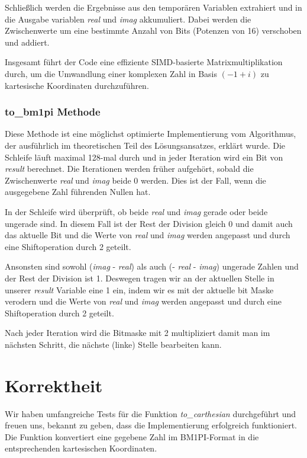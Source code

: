 \documentclass[course=erap]{aspdoc}
\begin{document}
    Schließlich werden die Ergebnisse aus den temporären Variablen extrahiert und in die Ausgabe variablen \textit{real} und \textit{imag} akkumuliert.
    Dabei werden die Zwischenwerte um eine bestimmte Anzahl von Bits (Potenzen von 16) verschoben und addiert.

    Insgesamt führt der Code eine effiziente SIMD-basierte Matrixmultiplikation durch, um die Umwandlung einer komplexen Zahl in Basis $(-1+i)$ zu kartesische Koordinaten durchzuführen.

    \subsubsection{to\_bm1pi Methode}
    Diese Methode ist eine möglichst optimierte Implementierung vom Algorithmus, der ausführlich im theoretischen Teil des Lösungsansatzes, erklärt wurde.
    Die Schleife läuft maximal 128-mal durch und in jeder Iteration wird ein Bit von \textit{result} berechnet.
    Die Iterationen werden früher aufgehört, sobald die Zwischenwerte \textit{real} und \textit{imag} beide 0 werden.
    Dies ist der Fall, wenn die ausgegebene Zahl führenden Nullen hat.

    In der Schleife wird überprüft, ob beide \textit{real} und \textit{imag} gerade oder beide ungerade sind.
    In diesem Fall ist der Rest der Division gleich 0 und damit auch das aktuelle Bit und die Werte von \textit{real} und \textit{imag} werden angepasst und durch eine Shiftoperation durch 2 geteilt.

    Ansonsten sind sowohl (\textit{imag} - \textit{real}) als auch (- \textit{real} - \textit{imag}) ungerade Zahlen und der Rest der Division ist 1.
    Deswegen tragen wir an der aktuellen Stelle in unserer \textit{result} Variable eine 1 ein, indem wir es mit der aktuelle bit Maske verodern und die Werte von \textit{real} und \textit{imag} werden angepasst und durch eine Shiftoperation durch 2 geteilt.

    Nach jeder Iteration wird die Bitmaske mit 2 multipliziert damit man im nächsten Schritt, die nächste (linke) Stelle bearbeiten kann.



    \section{Korrektheit}
    Wir haben umfangreiche Tests für die Funktion \textit{to\_carthesian} durchgeführt und freuen uns, bekannt zu geben, dass die Implementierung erfolgreich funktioniert. Die Funktion konvertiert eine gegebene Zahl im BM1PI-Format in die entsprechenden kartesischen Koordinaten.
\end{document}
